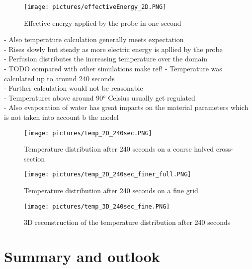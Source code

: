 \documentclass[parskip=half, titlepage=yes, 12pt, BCOR=12mm, DIV=calc]{scrartcl}
\begin{document}
\begin{figure}[H]
    \centering
    \texttt{[image: pictures/effectiveEnergy\_2D.PNG]}
    \caption{Effective energy applied by the probe in one second}
    \label{effectiveEnergy_2D}
\end{figure}


- Also temperature calculation generally meets expectation \\
- Rises slowly but steady as more electric energy is apllied by the probe \\
- Perfusion distributes the increasing temperature over the domain \\
- TODO compared with other simulations make ref!
- Temperature was calculated up to around 240 seconds \\
- Further calculation would not be reasonable \\
- Temperatures above around 90° Celsius usually get regulated \\
- Also evaporation of water has great impacts on the material parameters which is not taken into account b the model \\


\begin{figure}[H]
    \centering
    \texttt{[image: pictures/temp\_2D\_240sec.PNG]}
    \caption{Temperature distribution after 240 seconds on a coarse halved cross-section}
    \label{temp_2D_240sec}
\end{figure}


\begin{figure}[H]
    \centering
    \texttt{[image: pictures/temp\_2D\_240sec\_finer\_full.PNG]}
    \caption{Temperature distribution after 240 seconds on a fine grid}
    \label{temp_2D_240sec_finer_full}
\end{figure}


\begin{figure}[H]
    \centering
    \texttt{[image: pictures/temp\_3D\_240sec\_fine.PNG]}
    \caption{3D reconstruction of the temperature distribution after 240 seconds}
    \label{temp_3D_240sec_fine}
\end{figure}




\section{Summary and outlook}
\end{document}

